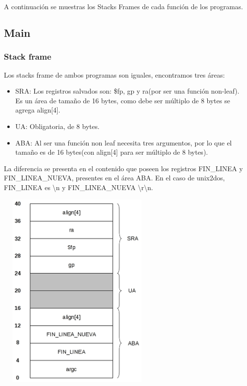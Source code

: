 \documentclass[a4paper,10pt]{article}
\begin{document}
  A continuaci\'on se muestras los Stacks Frames de cada funci\'on de los programas.

  \subsection{Main}
    \subsubsection{Stack frame}
    Los stacks frame de ambos programas son iguales, encontramos tres \'areas:
    \begin{itemize}
      \item SRA: Los registros salvados son: \$fp, gp y ra(por ser una funci\'on non-leaf). Es un \'area de 	      tama\~no de 16 bytes, como debe ser m\'ultiplo de 8 bytes se agrega align[4].
      \item UA: Obligatoria, de 8 bytes.
      \item ABA: Al ser una funci\'on non leaf necesita tres argumentos, por lo que el tama\~no es de 16 	      bytes(con align[4] para ser m\'ultiplo de 8 bytes). 
    \end{itemize}
    La diferencia se presenta en el contenido que poseen los registros FIN\_LINEA y FIN\_LINEA\_NUEVA, presentes en el \'area ABA. En el caso de unix2dos, FIN\_LINEA es \textbackslash n y FIN\_LINEA\_NUEVA \textbackslash r\textbackslash n.
      \begin{center}
	\includegraphics[width=8cm, height=10cm]{DibujosStackFrame/stack-main.jpg}
      \end{center}
\end{document}
